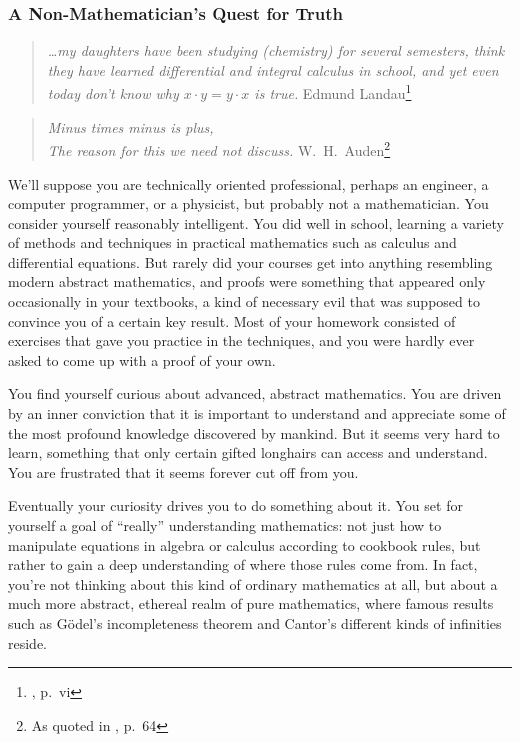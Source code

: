 \subsubsection{A Non-Mathematician's Quest for Truth}

\begin{quote}
  {\em \ldots my daughters have been studying (chemistry) for several
se\-mes\-ters, think they have learned differential and integral calculus in
school, and yet even today don't know why $x\cdot y=y\cdot x$ is true.}
  \flushright\sc  Edmund Landau\footnote{\cite{Landau}, p.~vi}\\
\end{quote}

\begin{quote}
  {\em Minus times minus is plus,\\
The reason for this we need not discuss.}
  \flushright\sc W.\ H.\ Auden\footnote{As quoted in \cite{Guillen}, p.~64}\\
\end{quote}

We'll suppose you are technically oriented professional, perhaps an engineer, a
computer programmer, or a physicist, but probably not a mathematician.  You
consider yourself reasonably intelligent.  You did well in school, learning a
variety of methods and techniques in practical mathematics such as calculus and
differential equations.  But rarely did your courses get into anything
resembling modern abstract mathematics, and proofs were something that appeared
only occasionally in your textbooks, a kind of necessary evil that was
supposed to convince you of a certain key result.  Most of your
homework consisted of exercises that gave you practice in the techniques, and
you were hardly ever asked to come up with a proof of your own.

You find yourself curious about advanced, abstract mathematics.  You are
driven by an inner conviction that it is important to understand and
appreciate some of the most profound knowledge discovered by mankind.  But it
seems very hard to learn, something that only certain gifted longhairs can
access and understand.  You are frustrated that it seems forever cut off from
you.

Eventually your curiosity drives you to do something about it.
You set for yourself a goal of ``really'' understanding mathematics:  not just
how to manipulate equations in algebra or calculus according to cookbook
rules, but rather to gain a deep understanding of where those rules come from.
In fact, you're not thinking about this kind of ordinary mathematics at all,
but about a much more abstract, ethereal realm of pure mathematics, where
famous results such as G\"{o}del's incompleteness theorem and Cantor's different kinds of infinities
reside.

